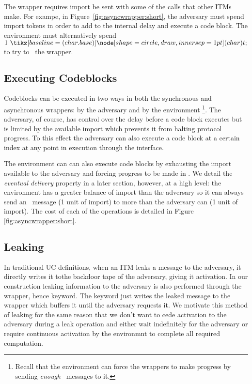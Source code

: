 The wrapper requires import be sent with some of the calls that other ITMs make. 
For exampe, in Figure~\ref{fig:asyncwrapper:short}, the adversary must spend import tokens in order to add to the internal delay and execute a code block.
The environment must alternatively spend $1 \token$ to try to \Advance~the wrapper.

\subsection{Executing Codeblocks}
Codeblocks can be executed in two ways in both the synchronous and asynchronous wrappers: by the adversary and by the environment \footnote{Recall that the environment can force the wrappers to make progress by sending {\em enough} \Advance~messages to it.}.
The adversary, of course, has control over the delay before a code block executes but is limited by the available import which prevents it from halting protocol progress.
To this effect the adversary can also execute a code block at a certain index at any point in execution through the \Exec interface.

The environment can can also execute code blocks by exhausting the import available to the adversary and forcing progress to be made in \Wasync.
We detail the {\em eventual delivery} property in a later section, however, at a high level: the environment has a greater balance of import than the adversary so it can always send an \Advance~message (1 unit of import) to \Wasync more than the adversary can \Delay (1 unit of import).
The cost of each of the operations is detailed in Figure \ref{fig:asyncwrapper:short}.

\subsection{Leaking}
In traditional UC definitions, when an ITM leaks a message to the adversary, it directly writes it tothe backdoor tape of the adversary, giving it activation.
In our construction leaking information to the adversary is also performed through the wrapper, hence \Leak keyword.
The \Leak keyword just writes the leaked message to the wrapper which buffers it until the adversary requests it.
We motivate this method of leaking for the same reason that we don't want to cede activation to the adversary during a leak operation and either wait indefinitely for the adversary or require continuous activation by the environmnt to complete all required computation.

